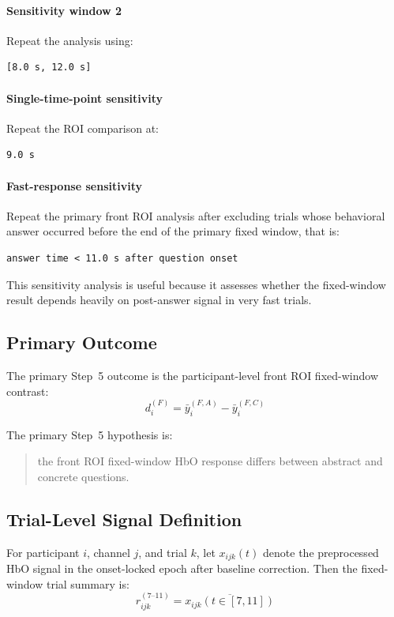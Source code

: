 \documentclass[11pt]{article}
\begin{document}
\paragraph{Sensitivity window 2}
Repeat the analysis using:
\begin{verbatim}
[8.0 s, 12.0 s]
\end{verbatim}

\paragraph{Single-time-point sensitivity}
Repeat the ROI comparison at:
\begin{verbatim}
9.0 s
\end{verbatim}

\paragraph{Fast-response sensitivity}
Repeat the primary front ROI analysis after excluding trials whose behavioral answer occurred
before the end of the primary fixed window, that is:
\begin{verbatim}
answer time < 11.0 s after question onset
\end{verbatim}

This sensitivity analysis is useful because it assesses whether the fixed-window result depends
heavily on post-answer signal in very fast trials.

\subsection{Primary Outcome}
The primary Step~5 outcome is the participant-level front ROI fixed-window contrast:
\begin{equation}
d^{(F)}_i = \bar{y}^{(F,A)}_i - \bar{y}^{(F,C)}_i
\end{equation}

The primary Step~5 hypothesis is:
\begin{quote}
the front ROI fixed-window HbO response differs between abstract and concrete questions.
\end{quote}

\subsection{Trial-Level Signal Definition}
For participant \(i\), channel \(j\), and trial \(k\), let \(x_{ijk}(t)\) denote the preprocessed
HbO signal in the onset-locked epoch after baseline correction.
Then the fixed-window trial summary is:
\begin{equation}
r^{(7\text{--}11)}_{ijk}
=
\overline{x_{ijk}(t \in [7,11])}
\end{equation}
\end{document}
